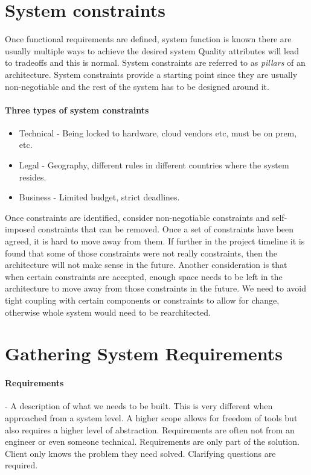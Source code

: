 \documentclass[a4paper, 11pt]{book}
\begin{document}
    \section{System constraints}
    Once functional requirements are defined, system function is known there are usually multiple ways to achieve the desired system
    Quality attributes will lead to tradeoffs and this is normal.
    System constraints are referred to as \textit{pillars} of an architecture.
    System constraints provide a starting point since they are usually non-negotiable and the rest of the system has to be designed around it.

    \paragraph{Three types of system constraints}

    \begin{itemize}
        \item Technical - Being locked to hardware, cloud vendors etc, must be on prem, etc.
        \item Legal - Geography, different rules in different countries where the system resides.
        \item Business - Limited budget, strict deadlines.
    \end{itemize}

    Once constraints are identified, consider non-negotiable constraints and self-imposed constraints that can be removed.
    Once a set of constraints have been agreed, it is hard to move away from them.
    If further in the project timeline it is found that some of those constraints were not really constraints, then the architecture will not make sense in the future.
    Another consideration is that when certain constraints are accepted, enough space needs to be left in the architecture to move away from those constraints in the future.
    We need to avoid tight coupling with certain components or constraints to allow for change, otherwise whole system would need to be rearchitected. %


    \section{Gathering System Requirements}

    \paragraph{Requirements} - A description of what we needs to be built.
    This is very different when approached from a system level.
    A higher scope allows for freedom of tools but also requires a higher level of abstraction.
    Requirements are often not from an engineer or even someone technical.
    Requirements are only part of the solution.
    Client only knows the problem they need solved.
    Clarifying questions are required.
\end{document}
